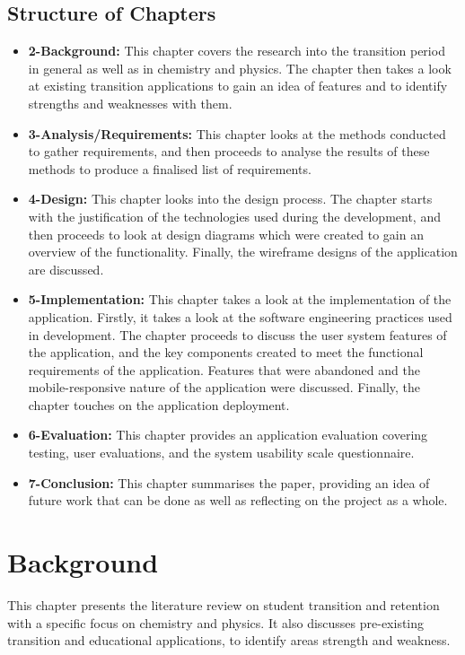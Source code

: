 \documentclass{l4proj}
\begin{document}
\section{Structure of Chapters}
\begin{itemize}
    \item \textbf{2-Background:} This chapter covers the research into the transition period in general as well as in chemistry and physics. The chapter then takes a look at existing transition applications to gain an idea of features and to identify strengths and weaknesses with them.
    \item \textbf{3-Analysis/Requirements:} This chapter looks at the methods conducted to gather requirements,  and then proceeds to analyse the results of these methods to produce a finalised list of requirements.
    \item \textbf{4-Design:} This chapter looks into the design process. The chapter starts with the justification of the technologies used during the development,  and then proceeds to look at design diagrams which were created to gain an overview of the functionality. Finally,  the wireframe designs of the application are discussed.
    \item \textbf{5-Implementation:} This chapter takes a look at the implementation of the application. Firstly,  it takes a look at the software engineering practices used in development. The chapter proceeds to discuss the user system features of the application,  and the key components created to meet the functional requirements of the application. Features that were abandoned and the mobile-responsive nature of the application were discussed. Finally,  the chapter touches on the application deployment.
    \item \textbf{6-Evaluation:} This chapter provides an application evaluation covering testing, user evaluations, and the system usability scale questionnaire.
    \item \textbf{7-Conclusion:} This chapter summarises the paper, providing an idea of future work that can be done as well as reflecting on the project as a whole.
\end{itemize}

\chapter{Background} \label{background}
This chapter presents the literature review on student transition and retention with a specific focus on chemistry and physics. It also discusses pre-existing transition and educational applications, to identify areas strength and weakness.
\end{document}
